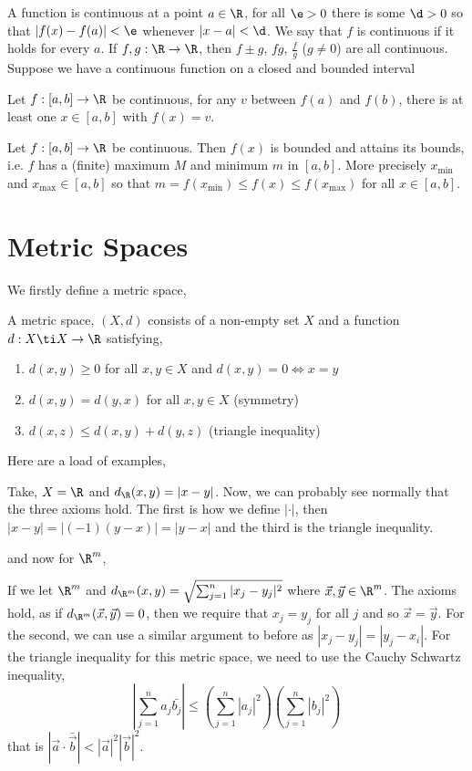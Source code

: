 \noindent
A function is continuous at a point $a \in \R$, for all $\e > 0$ there is some $\d > 0$ so that $|f(x) - f(a)| < \e$ whenever $|x - a| < \d$. We say that $f$ is continuous if it holds for every $a$. If $f, g : \R \to \R$, then $f \pm g$, $fg$, $\frac{f}{g}$ ($g \ne 0$) are all continuous. Suppose we have a continuous function on a closed and bounded interval
\begin{nthm}
  Let $f: [a, b] \to \R$ be continuous, for any $v$ between $f(a)$ and $f(b)$, there is at least one $x \in [a, b]$ with $f(x) = v$.
\end{nthm}

\begin{nthm}
  Let $f: [a, b] \to \R$ be continuous. Then $f(x)$ is bounded and attains its bounds, i.e. $f$ has a (finite) maximum $M$ and minimum $m$ in $[a, b]$. More precisely $x_{\text{min}}$ and $x_{\text{max}} \in [a, b]$ so that $m = f(x_{\text{min}}) \le f(x) \le f(x_{\text{max}})$ for all $x \in [a, b]$.
\end{nthm}

\section{Metric Spaces}
We firstly define a metric space,
\begin{ndefi}
  A metric space, $(X, d)$ consists of a non-empty set $X$ and a function $d : X \ti X \to \R$ satisfying,
  \begin{enumerate}
    \item $d(x, y) \ge 0$ for all $x, y \in X$ and $d(x, y) = 0 \iff x = y$
    \item $d(x, y) = d(y, x)$ for all $x, y \in X$ (symmetry)
    \item $d(x, z) \le d(x, y) + d(y, z)$ (triangle inequality)
  \end{enumerate}
\end{ndefi}

Here are a load of examples,
\begin{eg}
  Take, $X = \R$ and $d_\R(x, y) = |x - y|$. Now, we can probably see normally that the three axioms hold. The first is how we define $|\cdot|$, then $|x - y| = |(-1)(y - x)| = |y - x|$ and the third is the triangle inequality.
\end{eg}
and now for $\R^m$,
\begin{eg}
  If we let $\R^m$ and $d_{\R^m}(x, y) = \sqrt{\sum_{j=1}^n |x_j - y_j|^2}$ where $\vec x, \vec y  \in \R^m$. The axioms hold, as if $d_{\R^m}(\vec x, \vec y) = 0$, then we require that $x_j = y_j$ for all $j$ and so $\vec x = \vec y$. For the second, we can use a similar argument to before as $|x_j - y_j|= |y_j - x_i|$. For the triangle inequality for this metric space, we need to use the Cauchy Schwartz inequality,
  $$ \left| \sum_{j=1}^n a_j\bar{b_j} \right| \le \left(\sum_{j=1}^n |a_j|^2\right)\left(\sum_{j=1}^n |b_j|^2\right) $$
  that is $|\vec a \cdot \bar{\vec b}| < |\vec a|^2|\vec b|^2$.
\end{eg}

